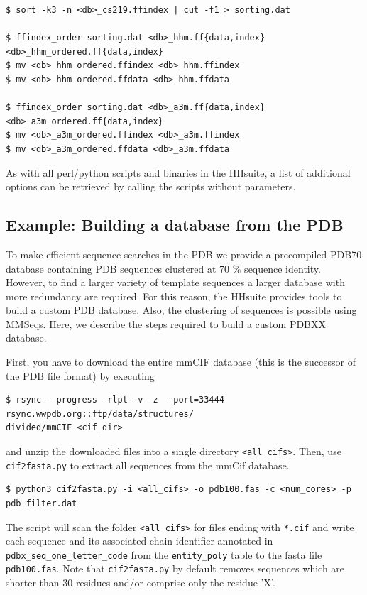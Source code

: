 \documentclass[11pt,a4paper]{article}
\begin{document}
\begin{verbatim}
$ sort -k3 -n <db>_cs219.ffindex | cut -f1 > sorting.dat

$ ffindex_order sorting.dat <db>_hhm.ff{data,index} <db>_hhm_ordered.ff{data,index}
$ mv <db>_hhm_ordered.ffindex <db>_hhm.ffindex
$ mv <db>_hhm_ordered.ffdata <db>_hhm.ffdata

$ ffindex_order sorting.dat <db>_a3m.ff{data,index} <db>_a3m_ordered.ff{data,index}
$ mv <db>_a3m_ordered.ffindex <db>_a3m.ffindex
$ mv <db>_a3m_ordered.ffdata <db>_a3m.ffdata
\end{verbatim}

As with all perl/python scripts and binaries in the HHsuite, a list of additional options can be retrieved by calling the scripts without parameters.

\subsection*{Example: Building a database from the PDB}

To make efficient sequence searches in the PDB we provide a precompiled PDB70 database containing PDB sequences clustered at 70 \% sequence identity. However, to find a larger variety of template sequences a larger database with more redundancy are required. For this reason, the HHsuite provides tools to build a custom PDB database. Also, the clustering of sequences is possible using MMSeqs. Here, we describe the steps required to build a custom PDBXX database.

First, you have to download the entire mmCIF database (this is the successor of the PDB file format) by executing

\begin{verbatim}
$ rsync --progress -rlpt -v -z --port=33444 rsync.wwpdb.org::ftp/data/structures/
divided/mmCIF <cif_dir>
\end{verbatim}

and unzip the downloaded files into a single directory \verb`<all_cifs>`. Then, use \verb`cif2fasta.py` to extract all sequences from the mmCif database.

\begin{verbatim}
$ python3 cif2fasta.py -i <all_cifs> -o pdb100.fas -c <num_cores> -p pdb_filter.dat
\end{verbatim}

The script will scan the folder \verb`<all_cifs>` for files ending with \verb`*.cif` and write each sequence and its associated chain identifier annotated in \verb`pdbx_seq_one_letter_code` from the \verb`entity_poly` table to the fasta file \verb`pdb100.fas`. Note that \verb`cif2fasta.py` by default removes sequences which are shorter than 30 residues and/or comprise only the residue 'X'. 
\end{document}
